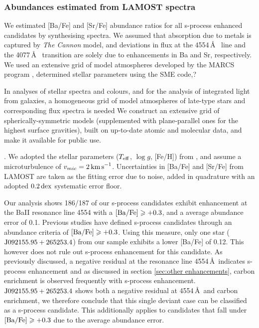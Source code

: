 \documentclass[a4paper,fleqn,usenatbib]{mnras}
\begin{document}
\subsubsection{Abundances estimated from LAMOST spectra}
We estimated [Ba/Fe] and [Sr/Fe] abundance ratios for all s-process enhanced candidates by synthesising spectra. We assumed that absorption due to metals is captured by \emph{The Cannon} model, and deviations in flux at the 4554\,\AA\  line and the 4077\,\AA\  transition are solely due to enhancements in Ba and Sr, respectively. We used an extensive grid of model
atmospheres developed by the MARCS program \citep{marcs}, determined stellar parameters using the SME code\citep{sme},? 


In analyses of stellar spectra and colours, and for the analysis of integrated light from galaxies, a homogeneous grid of model
atmospheres of late-type stars and corresponding flux spectra is needed
We construct an extensive grid of spherically-symmetric models (supplemented with plane-parallel ones for the highest surface
gravities), built on up-to-date atomic and molecular data, and make it available for public use.

\citep{marcs,sme,vald,ispec}. We adopted the stellar parameters ($T_{\rm eff}$, $\log{g}$, [Fe/H]) from \citet{ho2017}, and assume a microturbulence of $v_{mic} = 2\,{\rm km\,s}^{-1}$. Uncertainties in [Ba/Fe] and [Sr/Fe] from LAMOST are taken as the fitting error due to noise, added in quadrature with an adopted $0.2\,{\rm dex}$ systematic error floor.

Our analysis shows 186/187 of our s-process candidates exhibit enhancement at the BaII resonance line 4554 with a $\rm[Ba/Fe] \geq +0.3$, and a average abundance error of 0.1. Previous studies \citet{malaney1988} have defined s-process candidates through an abundance criteria of $\rm[Ba/Fe]\geq +0.3$. Using this measure, only one star ($\rm J092155.95+265253.4$) from our sample exhibits a lower [Ba/Fe] of 0.12. This however does not rule out s-process enhancement for this candidate. As previously discussed, a negative residual at the  resonance line 4554\,\AA\ indicates s-process enhancement and as discussed in section \ref{sec:other enhancements}, carbon enrichment is observed frequently with s-process enhancement. $\rm J092155.95+265253.4$ shows both a negative residual at 4554\,\AA\ and carbon enrichment, we therefore conclude that this single deviant case can be classified as a s-process candidate. This additionally applies to candidates that fall under $\rm[Ba/Fe]\geq +0.3$ due to the average abundance error. 
\end{document}
